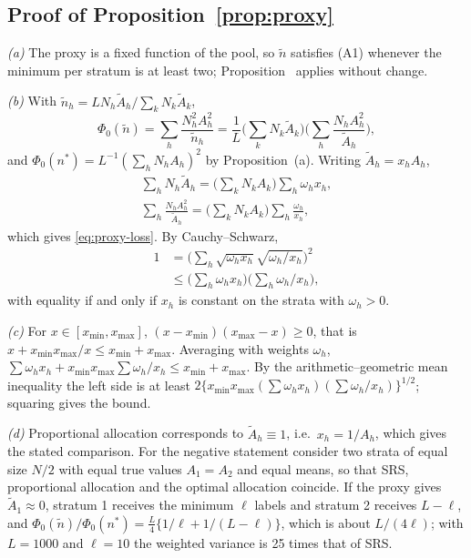 \subsection{Proof of Proposition~\ref{prop:proxy}}

\emph{(a)} The proxy is a fixed function of the pool, so $\tilde n$ satisfies (A1) whenever the
minimum per stratum is at least two; Proposition~ applies without change.

\emph{(b)} With $\tilde n_h=LN_h\tilde A_h/\sum_kN_k\tilde A_k$,
\[
\Phi_0(\tilde n)=\sum_h\frac{N_h^2A_h^2}{\tilde n_h}=\frac1L\Big(\sum_kN_k\tilde A_k\Big)\Big(\sum_h\frac{N_hA_h^2}{\tilde A_h}\Big),
\]
and $\Phi_0(n^\ast)=L^{-1}(\sum_hN_hA_h)^2$ by Proposition~(a). Writing
$\tilde A_h=x_hA_h$,
\begin{gather*}
\sum_hN_h\tilde A_h=\Big(\sum_kN_kA_k\Big)\sum_h\omega_hx_h,\\
\sum_h\frac{N_hA_h^2}{\tilde A_h}=\Big(\sum_kN_kA_k\Big)\sum_h\frac{\omega_h}{x_h},
\end{gather*}
which gives \eqref{eq:proxy-loss}. By Cauchy--Schwarz,
\begin{align*}
1&=\Big(\sum_h\sqrt{\omega_hx_h}\sqrt{\omega_h/x_h}\Big)^2\\
&\le\Big(\sum_h\omega_hx_h\Big)\Big(\sum_h\omega_h/x_h\Big),
\end{align*}
with equality if and only if $x_h$ is constant on the strata with $\omega_h>0$.

\emph{(c)} For $x\in[x_{\min},x_{\max}]$, $(x-x_{\min})(x_{\max}-x)\ge0$, that is
$x+x_{\min}x_{\max}/x\le x_{\min}+x_{\max}$. Averaging with weights $\omega_h$,
$\sum\omega_hx_h+x_{\min}x_{\max}\sum\omega_h/x_h\le x_{\min}+x_{\max}$. By the arithmetic--geometric
mean inequality the left side is at least
$2\{x_{\min}x_{\max}(\sum\omega_hx_h)(\sum\omega_h/x_h)\}^{1/2}$; squaring gives the bound.

\emph{(d)} Proportional allocation corresponds to $\tilde A_h\equiv1$, i.e.\ $x_h=1/A_h$, which gives
the stated comparison. For the negative statement consider two strata of equal size $N/2$ with
equal true values $A_1=A_2$ and equal means, so that SRS, proportional allocation and the optimal
allocation coincide. If the proxy gives $\tilde A_1\approx0$, stratum 1 receives the minimum $\ell$
labels and stratum 2 receives $L-\ell$, and
$\Phi_0(\tilde n)/\Phi_0(n^\ast)=\frac{L}{4}\{1/\ell+1/(L-\ell)\}$, which is about $L/(4\ell)$; with
$L=1000$ and $\ell=10$ the weighted variance is 25 times that of SRS.

